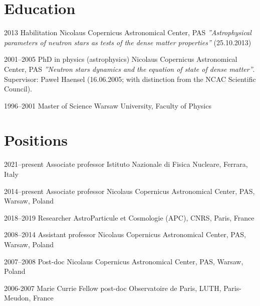 \documentclass[]{friggeri-cv} %
\begin{document}

\section{Education}
\begin{entrylist}
\entry
{2013}
{Habilitation}
{Nicolaus Copernicus Astronomical Center, PAS} 
{{ \it ''Astrophysical parameters of neutron stars as tests of the dense matter properties''} (25.10.2013)} 

\entry
{2001--2005}
{PhD {\normalfont in physics (astrophysics)}}
{Nicolaus Copernicus Astronomical Center, PAS}
{{\it ''Neutron stars dynamics and the equation of state of dense matter''}. Supervisor: Paweł Haensel (16.06.2005; with distinction from the NCAC Scientific Council).} 

\entry
{1996--2001}
{Master {\normalfont of Science}}
{Warsaw University, Faculty of Physics}

\end{entrylist}


\section{Positions}
\begin{entrylist}

\entry
{2021--present} 
{Associate professor}
{Istituto Nazionale di Fisica Nucleare, Ferrara, Italy}

\entry
{2014--present}
{Associate professor}
{Nicolaus Copernicus Astronomical Center, PAS, Warsaw, Poland}


\entry
{2018--2019}
{Researcher}
{AstroParticule et Cosmologie (APC), CNRS, Paris, France}

\entry
{2008--2014}
{Assistant professor}
{Nicolaus Copernicus Astronomical Center, PAS, Warsaw, Poland}

\entry
{2007--2008}
{Post-doc}
{Nicolaus Copernicus Astronomical Center, PAS, Warsaw, Poland}

\entry
{2006-2007}
{Marie Currie Fellow post-doc}
{Observatoire de Paris, LUTH, Paris-Meudon, France}

\end{entrylist}
\end{document}
